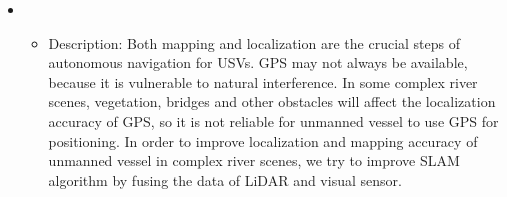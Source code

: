 \begin{itemize}[leftmargin=*]
    \item {}
    {\small
     \begin{itemize}
         \item{Description: Both mapping and localization are the crucial steps of autonomous navigation for USVs. GPS may not always be available, because it is vulnerable to natural interference. In some complex river scenes, vegetation, bridges and other obstacles will affect the localization accuracy of GPS, so it is not reliable for unmanned vessel to use GPS for positioning. In order to improve localization and mapping accuracy of unmanned vessel in complex river scenes, we try to improve SLAM algorithm by fusing the data of LiDAR and visual sensor.}
     \end{itemize}
    }

  \end{itemize}
